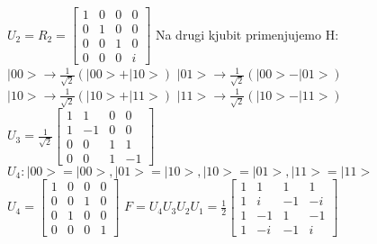 \documentclass{article}
\begin{document}
$U_2 = R_2 = \begin{bmatrix}
    1 & 0 & 0 & 0\\
    0 & 1 & 0 & 0 \\
    0 & 0 & 1 & 0\\
    0 & 0 & 0 & i
\end{bmatrix}$
\vspace{0.2cm}\newline\hspace*{0.2cm}
Na drugi kjubit primenjujemo H:\newline\hspace*{0.2cm}
$|00> \longrightarrow \frac{1}{\sqrt{2}}(|00> + |10>)$
\newline\hspace*{0.2cm}
$|01> \longrightarrow \frac{1}{\sqrt{2}}(|00> - |01>)$
\newline\hspace*{0.2cm}
$|10> \longrightarrow \frac{1}{\sqrt{2}}(|10> + |11>)$
\newline\hspace*{0.2cm}
$|11> \longrightarrow \frac{1}{\sqrt{2}}(|10> - |11>)$
\vspace{0.2cm}\newline\hspace*{0.4cm}
$U_3 = \frac{1}{\sqrt{2}}\begin{bmatrix}
    1 & 1 & 0 & 0\\
    1 & -1 & 0 & 0 \\
    0 & 0 & 1 & 1\\
    0 & 0 & 1 & -1
\end{bmatrix}$
\vspace{0.4cm}\newline\hspace*{0.4cm}
$U_4: |00> = |00>, |01> = |10>, |10> = |01>, |11> = |11>$
\vspace{0.2cm}\newline\hspace*{0.4cm}
$U_4 = \begin{bmatrix}
    1 & 0 & 0 & 0\\
    0 & 0 & 1 & 0 \\
    0 & 1 & 0 & 0\\
    0 & 0 & 0 & 1
\end{bmatrix}$
\vspace{0.5cm}\newline\hspace*{0.4cm}
$F = U_4U_3U_2U_1 = \frac{1}{2}\begin{bmatrix}
    1 & 1 & 1 & 1\\
    1 & i & -1 & -i\\
    1 & -1 & 1 & -1\\
    1 & -i & -1 & i
\end{bmatrix}$
\newpage
\end{document}
